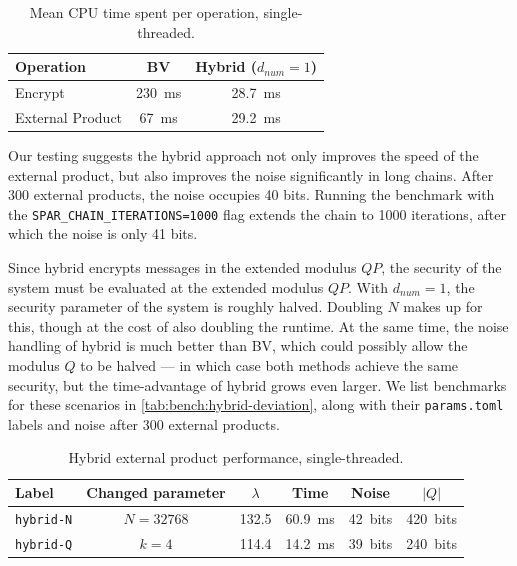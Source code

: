 \begin{table}[H]
    \caption{Mean CPU time spent per operation, single-threaded.}
    \label{tab:bench:hybrid}
    \centering
    \begin{tabular}{lcc}
        \toprule
        \textbf{Operation}  & \textbf{BV}  & \textbf{Hybrid ($d_{num} = 1$)}  \\
        \midrule
        Encrypt             & \num{230}~ms & \num{28.7}~ms \\
        External Product    & \num{67}~ms  & \num{29.2}~ms \\
        \bottomrule
    \end{tabular}
\end{table}

Our testing suggests the hybrid approach not only improves the speed of the external product, but also improves the noise significantly in long chains. After 300 external products, the noise occupies 40 bits. Running the benchmark with the \texttt{SPAR\_CHAIN\_ITERATIONS=1000} flag extends the chain to 1000 iterations, after which the noise is only 41 bits.



\begin{remark}
    \label{rem:hybrid-security}
    Since hybrid encrypts messages in the extended modulus $QP$, the security of the system must be evaluated at the extended modulus $QP$. With $d_{num} = 1$, the security parameter of the system is roughly halved. Doubling $N$ makes up for this, though at the cost of also doubling the runtime. At the same time, the noise handling of hybrid is much better than BV, which could possibly allow the modulus $Q$ to be halved --- in which case both methods achieve the same security, but the time-advantage of hybrid grows even larger. We list benchmarks for these scenarios in \autoref{tab:bench:hybrid-deviation}, along with their \texttt{params.toml} labels and noise after 300 external products.
\end{remark}

\vfill
\newpage
\vfill

\begin{table}[H]
    \caption{Hybrid external product performance, single-threaded.}
    \label{tab:bench:hybrid-deviation}
    \centering
    \begin{tabular}{lccccc}
        \toprule
        \textbf{Label} & \textbf{Changed parameter} & $\lambda$ & \textbf{Time} & \textbf{Noise} & $|Q|$ \\
        \midrule
        \texttt{hybrid-N} & $N=32768$ & {132.5} & \num{60.9}~ms & 42~bits & 420~bits \\
        \texttt{hybrid-Q} & $k=4$     & {114.4} & \num{14.2}~ms & 39~bits & 240~bits \\
        \bottomrule
    \end{tabular}
\end{table}
    
